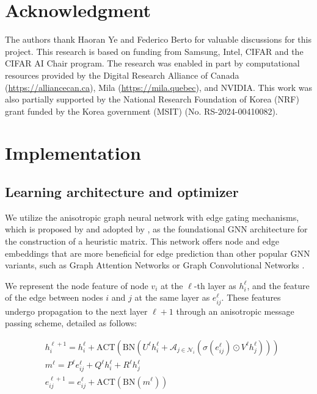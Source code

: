 \documentclass[twoside]{article}
\theoremstyle{plain}
\theoremstyle{definition}
\theoremstyle{remark}
\begin{document}
\section*{Acknowledgment}

The authors thank Haoran Ye and Federico Berto for valuable discussions for this project. This research is based on funding from Samsung, Intel, CIFAR and the CIFAR AI Chair program. The research was enabled in part by computational resources provided by the Digital Research Alliance of
Canada (\url{https://alliancecan.ca}), Mila (\url{https://mila.quebec}), and NVIDIA. This work was also partially supported by the National Research Foundation of Korea (NRF) grant funded by the
Korea government (MSIT) (No. RS-2024-00410082).


















\appendix
\onecolumn

\section{Implementation} \label{app:implement}


\subsection{Learning architecture and optimizer}

We utilize the anisotropic graph neural network with edge gating mechanisms, which is proposed by \citet{joshi2021learning} and adopted by \citet{ye2023deepaco}, as the foundational GNN architecture for the construction of a heuristic matrix. This network offers node and edge embeddings that are more beneficial for edge prediction than other popular GNN variants, such as Graph Attention Networks \citep{velivckovic2018graph} or Graph Convolutional Networks \citep{kipf2016semi}.

We represent the node feature of node $v_i$ at the $\ell$-th layer as $h_i^\ell$, and the feature of the edge between nodes $i$ and $j$ at the same layer as $e_{ij}^\ell$. These features undergo propagation to the next layer $\ell+1$ through an anisotropic message passing scheme, detailed as follows:

\begin{align}
& h_i^{\ell+1} =  h_i^\ell + \text{ACT}(\text{BN}(U^{\ell}h_i^\ell + \mathcal{A}_{j\in \mathcal{N}_i}(\sigma(e^\ell_{ij}) \odot V^\ell h_j^\ell))) \\
& m^\ell = P^\ell e_{ij}^\ell + Q^\ell h_i^\ell + R^\ell h_j^\ell \\
& e_{ij}^{\ell+1} = e_{ij}^\ell + \text{ACT}(\text{BN}(m^\ell))
\end{align}
\end{document}
